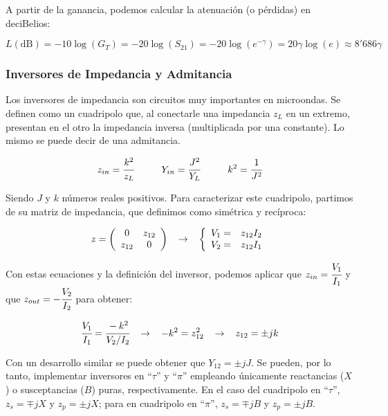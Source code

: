 \documentclass[12pt]{article}
\begin{document}
A partir de la ganancia, podemos calcular la atenuaci\'on (o p\'erdidas) en deciBelios:

$$L(\text{dB}) = -10 \log(G_T) = -20 \log(S_{21}) = -20 \log(e^{-\gamma}) = 20\gamma \log(e) \approx 8'686 \gamma$$


\subsubsection{Inversores de Impedancia y Admitancia}

Los inversores de impedancia son circuitos muy importantes en microondas. Se definen como un cuadripolo que, al conectarle una impedancia $z_L$ en un extremo, presentan en el otro la impedancia inversa (multiplicada por una constante). Lo mismo se puede decir de una admitancia.

$$z_{in} = \cfrac{k^2}{z_L} \hspace{1cm} Y_{in} = \cfrac{J^2}{Y_L} \hspace{1cm} k^2 = \cfrac{1}{J^2}$$

Siendo $J$ y $k$ n\'umeros reales positivos. Para caracterizar este cuadripolo, partimos de su matriz de impedancia, que definimos como sim\'etrica y rec\'iproca:

$$z =\left(\begin{array}{cc}
	0 & z_{12}\\
	z_{12} & 0
\end{array}\right)
\hspace{0.3cm} \rightarrow \hspace{0.3cm}
\left\{\begin{array}{cc}
	V_1 = & z_{12} I_2\\
	V_2 = & z_{12} I_1
\end{array}\right.$$

Con estas ecuaciones y la definici\'on del inversor, podemos aplicar que $z_{in} = \cfrac{V_1}{I_1}$ y que $z_{out} = - \cfrac{V_2}{I_2}$ para obtener:

$$\cfrac{V_1}{I_1} = \cfrac{-k^2}{V_2/I_2} \hspace{0.3cm} \rightarrow \hspace{0.3cm} -k^2 = z_{12}^2 \hspace{0.3cm} \rightarrow \hspace{0.3cm} z_{12} = \pm jk$$

Con un desarrollo similar se puede obtener que $Y_{12} = \pm jJ$. Se pueden, por lo tanto, implementar inversores en ``$\tau$'' y ``$\pi$'' empleando \'unicamente reactancias ($X$) o susceptancias ($B$) puras, respectivamente. En el caso del cuadripolo en ``$\tau$'', $z_{s} = \mp jX$ y $z_{p} = \pm jX$; para en cuadripolo en ``$\pi$'', $z_{s} = \mp jB$ y $z_{p} = \pm jB$.
\end{document}
